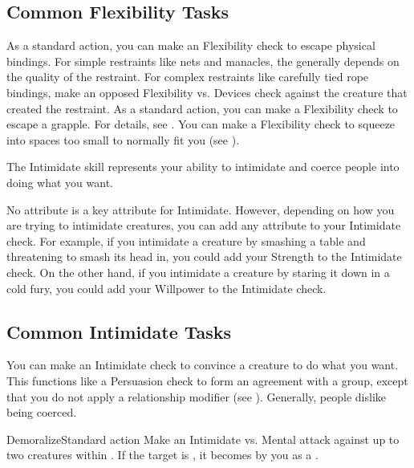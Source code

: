   \subsection{Common Flexibility Tasks}

     As a standard action, you can make an Flexibility check to escape physical bindings.
    For simple restraints like nets and manacles, the  generally depends on the quality of the restraint.
    For complex restraints like carefully tied rope bindings, make an opposed Flexibility vs. Devices check against the creature that created the restraint.
     As a standard action, you can make a Flexibility check to escape a grapple.
    For details, see .
     You can make a Flexibility check to squeeze into spaces too small to normally fit you (see ).

\newpage
{}
  The Intimidate skill represents your ability to intimidate and coerce people into doing what you want.

  No attribute is a key attribute for Intimidate.
  However, depending on how you are trying to intimidate creatures, you can add any attribute to your Intimidate check.
  For example, if you intimidate a creature by smashing a table and threatening to smash its head in, you could add your Strength to the Intimidate check.
  On the other hand, if you intimidate a creature by staring it down in a cold fury, you could add your Willpower to the Intimidate check.

  \subsection{Common Intimidate Tasks}
     You can make an Intimidate check to convince a creature to do what you want. This functions like a Persuasion check to form an agreement with a group, except that you do not apply a relationship modifier (see ).
    Generally, people dislike being coerced.

    \begin{activeability}{Demoralize}{Standard action}
      \rankline
      Make an Intimidate vs. Mental attack against up to two creatures within \shortrange.
      \hit If the target is , it becomes \frightened by you as a .
    \end{activeability}

